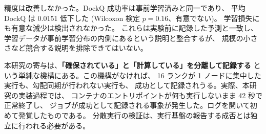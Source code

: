 \documentclass[11pt,a4paper]{article}
\begin{document}
精度は改善しなかった。DockQ 成功率は事前学習済みと同一であり、
平均 DockQ は 0.0151 低下した (Wilcoxon 検定 $p = 0.16$、有意でない)。
学習損失にも有意な減少は検出されなかった。
これらは実験前に記録した予測と一致し、
学習データが事前学習分布の内側にあるという説明と整合するが、
規模の小ささなど競合する説明を排除できてはいない。

本研究の寄与は、\textbf{「確保されている」と「計算している」を分離して記録する}
という単純な機構にある。この機構がなければ、
16 ランクが 1 ノードに集中した実行も、勾配同期が行われない実行も、
成功として記録されうる。実際、本研究の実装過程では、
コンテナのエントリポイントが何も実行しないまま 42 秒で正常終了し、
ジョブが成功として記録される事象が発生した。ログを開いて初めて発覚したものである。
分散実行の検証は、実行基盤の報告する成否とは独立に行われる必要がある。



\end{document}
